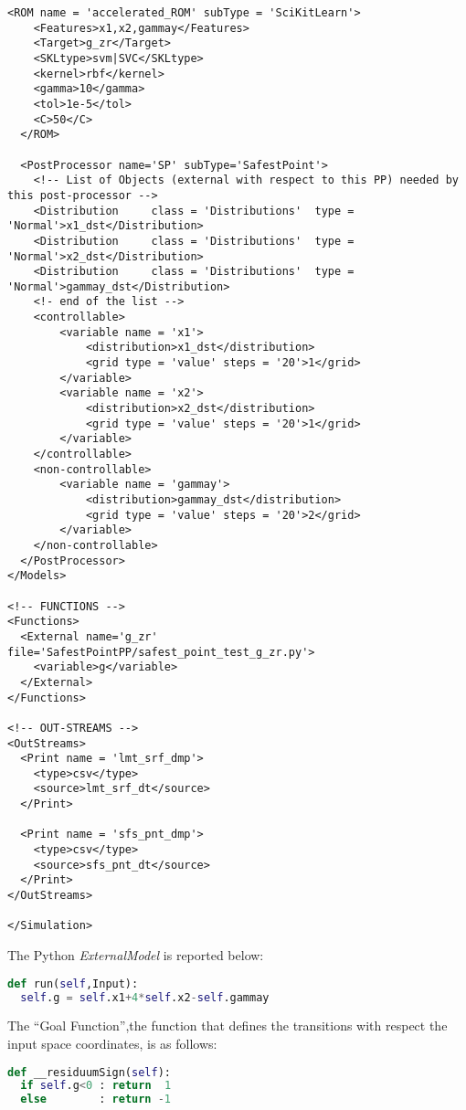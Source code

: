 \begin{lstlisting}[style=XML,morekeywords={debug,re,seeding,class,subType,limit}]
  <ROM name = 'accelerated_ROM' subType = 'SciKitLearn'>
    <Features>x1,x2,gammay</Features>
    <Target>g_zr</Target>
    <SKLtype>svm|SVC</SKLtype>
    <kernel>rbf</kernel>
    <gamma>10</gamma>
    <tol>1e-5</tol>
    <C>50</C>
  </ROM>

  <PostProcessor name='SP' subType='SafestPoint'>
    <!-- List of Objects (external with respect to this PP) needed by this post-processor -->
    <Distribution     class = 'Distributions'  type = 'Normal'>x1_dst</Distribution>
    <Distribution     class = 'Distributions'  type = 'Normal'>x2_dst</Distribution>
    <Distribution     class = 'Distributions'  type = 'Normal'>gammay_dst</Distribution>
    <!- end of the list -->
    <controllable>
    	<variable name = 'x1'>
    		<distribution>x1_dst</distribution>
    		<grid type = 'value' steps = '20'>1</grid>
    	</variable>
    	<variable name = 'x2'>
    		<distribution>x2_dst</distribution>
    		<grid type = 'value' steps = '20'>1</grid>
    	</variable>
    </controllable>
    <non-controllable>
    	<variable name = 'gammay'>
    		<distribution>gammay_dst</distribution>
    		<grid type = 'value' steps = '20'>2</grid>
    	</variable>
    </non-controllable>
  </PostProcessor>
</Models>

<!-- FUNCTIONS -->
<Functions>
  <External name='g_zr' file='SafestPointPP/safest_point_test_g_zr.py'>
    <variable>g</variable>
  </External>
</Functions>

<!-- OUT-STREAMS -->
<OutStreams> 
  <Print name = 'lmt_srf_dmp'>
  	<type>csv</type>
  	<source>lmt_srf_dt</source>
  </Print>

  <Print name = 'sfs_pnt_dmp'>
  	<type>csv</type>
  	<source>sfs_pnt_dt</source>
  </Print>
</OutStreams>

</Simulation>
\end{lstlisting}
The Python \textit{ExternalModel} is reported below:
\begin{lstlisting}[language=python]
def run(self,Input):
  self.g = self.x1+4*self.x2-self.gammay
\end{lstlisting}
The ``Goal Function'',the function that defines the transitions with respect the input space coordinates, is as follows:
\begin{lstlisting}[language=python]
def __residuumSign(self):
  if self.g<0 : return  1
  else        : return -1
\end{lstlisting}

